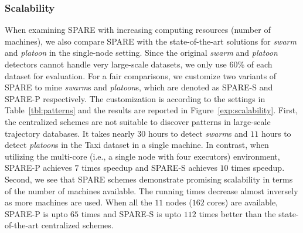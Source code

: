 \subsubsection{Scalability}
When examining SPARE with increasing computing resources (number of machines), we also compare SPARE with the state-of-the-art solutions for \emph{swarm} and \emph{platoon} in the single-node setting. Since the original \emph{swarm} and \emph{platoon} detectors cannot handle very large-scale datasets, we only use 60\% of each dataset for evaluation. For a fair comparisons, we customize two variants of SPARE to mine \emph{swarm}s and \emph{platoon}s, which are denoted as SPARE-S and SPARE-P respectively. The customization is according to the settings in Table~\ref{tbl:patterns} and the results are reported in Figure~\ref{exp:scalability}. 
First, the centralized schemes are not suitable to discover patterns in 
large-scale trajectory databases. It takes nearly $30$ hours to 
detect \emph{swarm}s and $11$ hours to detect \emph{platoon}s in the Taxi dataset in a single machine. 
In contrast, when utilizing the multi-core (i.e., a single node with four executors) environment, 
SPARE-P achieves $7$ times speedup and SPARE-S achieves $10$ times speedup. 
Second, we see that SPARE schemes demonstrate promising scalability in terms of the number of machines available. The running times decrease almost inversely as more machines are used. 
When all the $11$ nodes ($162$ cores) are available, 
SPARE-P is upto $65$ times and SPARE-S is upto $112$ times better than the state-of-the-art centralized schemes.
%
